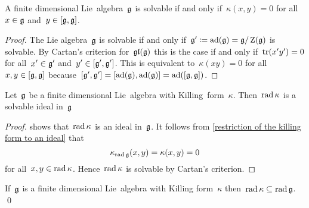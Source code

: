 \begin{theorem}
  A finite dimensional Lie~algebra~$\mathfrak{g}$ is solvable if and only if~$\kappa(x,y) = 0$ for all~$x \in \mathfrak{g}$ and~$y \in [\mathfrak{g}, \mathfrak{g}]$.
\end{theorem}


\begin{proof}
  The Lie algebra~$\mathfrak{g}$ is solvable if and only if~$\mathfrak{g}' \coloneqq \operatorname{ad}(\mathfrak{g}) = \mathfrak{g}/\operatorname{Z}(\mathfrak{g})$ is solvable.
  By Cartan’s criterion for~$\mathfrak{gl}(\mathfrak{g})$ this is the case if and only if~$\operatorname{tr}(x' y') = 0$ for all~$x' \in \mathfrak{g}'$ and~$y' \in [\mathfrak{g}', \mathfrak{g}']$.
  This is equivalent to~$\kappa(xy) = 0$ for all~$x, y \in [\mathfrak{g}, \mathfrak{g}]$ because~$[\mathfrak{g}', \mathfrak{g}'] = [\operatorname{ad}(\mathfrak{g}), \operatorname{ad}(\mathfrak{g})] = \operatorname{ad}([\mathfrak{g}, \mathfrak{g}])$.
\end{proof}


\begin{corollary}
  \label{rad kappa is a solvable ideal}
  Let~$\mathfrak{g}$ be a finite dimensional Lie~algebra with Killing~form~$\kappa$.
  Then~$\operatorname{rad} \kappa$ is a solvable ideal in~$\mathfrak{g}$
\end{corollary}


\begin{proof}
   shows that~$\operatorname{rad} \kappa$ is an ideal in~$\mathfrak{g}$.
  It follows from \cref{restriction of the killing form to an ideal} that
  \[
    \kappa_{\operatorname{rad} \mathfrak{g}}(x,y)
    =
    \kappa(x,y)
    =
    0
  \]
  for all~$x, y \in \operatorname{rad} \kappa$.
  Hence~$\operatorname{rad} \kappa$ is solvable by Cartan’s criterion.
\end{proof}


\begin{corollary}
  If~$\mathfrak{g}$ is a finite dimensional Lie~algebra with Killing form~$\kappa$ then~$\operatorname{rad} \kappa \subseteq \operatorname{rad} \mathfrak{g}$.
  \qed
\end{corollary}




